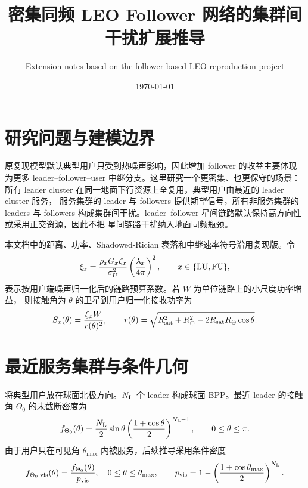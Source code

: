 \documentclass[UTF8,a4paper,11pt]{ctexart}
\title{密集同频 LEO Follower 网络的集群间干扰扩展推导}
\author{Extension notes based on the follower-based LEO reproduction project}
\date{\today}
\newcommand{\Rearth}{R_{\oplus}}
\newcommand{\Rsat}{R_{\rm sat}}
\newcommand{\thetam}{\theta_{\max}}
\newcommand{\NL}{N_{\rm L}}
\begin{document}
\maketitle

\section{研究问题与建模边界}

原复现模型默认典型用户只受到热噪声影响，因此增加 follower 的收益主要体现为更多
leader--follower--user 中继分支。这里研究一个更密集、也更保守的场景：所有
leader cluster 在同一地面下行资源上全复用，典型用户由最近的 leader cluster 服务，
服务集群的 leader 与 followers 提供期望信号，所有非服务集群的 leaders 与 followers
构成集群间干扰。leader--follower 星间链路默认保持高方向性或采用正交资源，因此不把
星间链路干扰纳入地面同频瓶颈。

本文档中的距离、功率、Shadowed-Rician 衰落和中继速率符号沿用复现版。令
\begin{equation}
    \xi_x
    =
    \frac{\rho_x G_x \zeta_x}{\sigma_U^2}
    \left(\frac{\lambda_x}{4\pi}\right)^2,
    \qquad x\in\{{\rm LU},{\rm FU}\},
\end{equation}
表示按用户端噪声归一化后的链路预算系数。若 $W$ 为单位链路上的小尺度功率增益，
则接触角为 $\theta$ 的卫星到用户归一化接收功率为
\begin{equation}
    S_x(\theta)=\frac{\xi_x W}{r(\theta)^2},
    \qquad
    r(\theta)=\sqrt{\Rsat^2+\Rearth^2-2\Rsat\Rearth\cos\theta}.
\end{equation}

\section{最近服务集群与条件几何}

将典型用户放在球面北极方向。$\NL$ 个 leader 构成球面 BPP。最近 leader 的接触角
$\Theta_0$ 的未截断密度为
\begin{equation}
    f_{\Theta_0}(\theta)
    =
    \frac{\NL}{2}\sin\theta
    \left(\frac{1+\cos\theta}{2}\right)^{\NL-1},
    \qquad 0\leq \theta\leq \pi .
    \label{eq:nearest-density}
\end{equation}
由于用户只在可见角 $\thetam$ 内被服务，后续推导采用条件密度
\begin{equation}
    f_{\Theta_0\mid{\rm vis}}(\theta)
    =
    \frac{f_{\Theta_0}(\theta)}
    {p_{\rm vis}},
    \quad
    0\leq\theta\leq\thetam,
    \qquad
    p_{\rm vis}
    =
    1-
    \left(\frac{1+\cos\thetam}{2}\right)^{\NL}.
    \label{eq:visible-nearest}
\end{equation}
\end{document}
